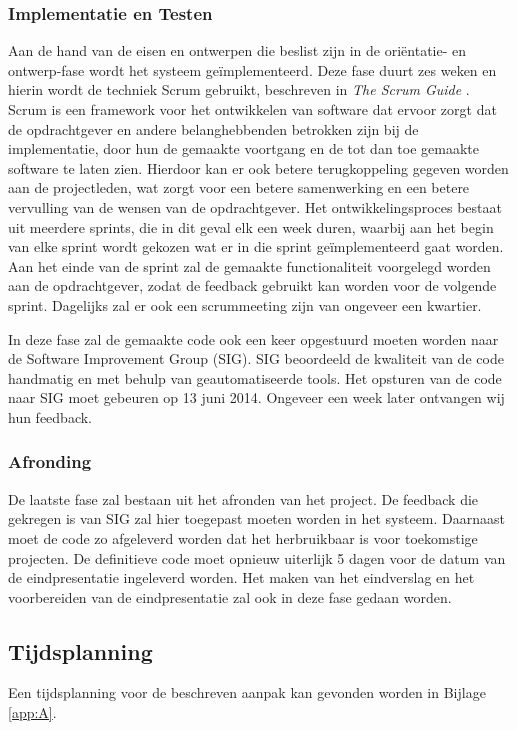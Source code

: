 \subsubsection{Implementatie en Testen}
Aan de hand van de eisen en ontwerpen die beslist zijn in de ori\"entatie- en ontwerp-fase wordt het systeem ge\"implementeerd. Deze fase duurt zes weken en hierin wordt de techniek Scrum gebruikt, beschreven in \emph{The Scrum Guide} \cite{schwaber2011}. Scrum is een framework voor het ontwikkelen van software dat ervoor zorgt dat de opdrachtgever en andere belanghebbenden betrokken zijn bij de implementatie, door hun de gemaakte voortgang en de tot dan toe gemaakte software te laten zien. Hierdoor kan er ook betere terugkoppeling gegeven worden aan de projectleden, wat zorgt voor een betere samenwerking en een betere vervulling van de wensen van de opdrachtgever. Het ontwikkelingsproces bestaat uit meerdere sprints, die in dit geval elk een week duren, waarbij aan het begin van elke sprint wordt gekozen wat er in die sprint ge\"implementeerd gaat worden. Aan het einde van de sprint zal de gemaakte functionaliteit voorgelegd worden aan de opdrachtgever, zodat de feedback gebruikt kan worden voor de volgende sprint. Dagelijks zal er ook een scrummeeting zijn van ongeveer een kwartier.

In deze fase zal de gemaakte code ook een keer opgestuurd moeten worden naar de Software Improvement Group (SIG). SIG beoordeeld de kwaliteit van de code handmatig en met behulp van geautomatiseerde tools. Het opsturen van de code naar SIG moet gebeuren op 13 juni 2014. Ongeveer een week later ontvangen wij hun feedback.

\subsubsection{Afronding}
De laatste fase zal bestaan uit het afronden van het project. De feedback die gekregen is van SIG zal hier toegepast moeten worden in het systeem. Daarnaast moet de code zo afgeleverd worden dat het herbruikbaar is voor toekomstige projecten. De definitieve code moet opnieuw uiterlijk 5 dagen voor de datum van de eindpresentatie ingeleverd worden. Het maken van het eindverslag en het voorbereiden van de eindpresentatie zal ook in deze fase gedaan worden.

\subsection{Tijdsplanning}
Een tijdsplanning voor de beschreven aanpak kan gevonden worden in Bijlage \ref{app:A}.
